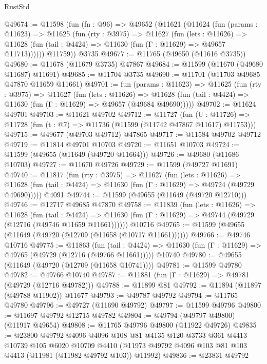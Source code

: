 \begin{lexlean}{RustStd}
\begin{coremodule}
@49674 := @11598
    (fun (fn : @96) =>
    @49652
      (@11621
        (@11624
          (fun (params : @11623) =>
          @11625
            (fun (rty : @3975) =>
            @11627
              (fun (lets : @11626) =>
              @11628 (fun (tail : @4424) => @11630 (fun (Γ : @11629) => @49657 @11713))))))
        @11759))
    @3735
@49677 := @11765 (@49650 (@11616 @3735))
@49680 := @11678 (@11679 @3735) @47867
@49684 := @11599 (@11670 (@49680 @11687) @11691)
@49685 := @11704 @3735
@49690 := @11701 (@11703 @49685 @47870 @11659 @11661)
@49701 := fun (params : @11623) =>
  @11625
    (fun (rty : @3975) =>
    @11627
      (fun (lets : @11626) =>
      @11628 (fun (tail : @4424) => @11630 (fun (Γ : @11629) => @49657 (@49684 @49690)))))
@49702 := @11624 @49701
@49703 := @11621 @49702
@49712 := @11727
    (fun (U : @11726) => @11728 (fun (t : @7) => @11736 (@11599 (@11742 @47867 @11617) @11753)))
@49715 := @49677 (@49703 @49712) @47865
@49717 := @11584 @49702 @49712
@49719 := @11814 @49701 @10703
@49720 := @11651 @10703
@49724 := @11599 (@49655 (@11649 (@49720 @11664)))
@49726 := @49680 (@11686 @10703)
@49727 := @11670 @49726
@49729 := @11599 (@49727 @11691)
@49740 := @11817
    (fun (rty : @3975) =>
    @11627
      (fun (lets : @11626) =>
      @11628 (fun (tail : @4424) => @11630 (fun (Γ : @11629) => @49724 (@49729 @49690)))))
    @4091
@49744 := @11599 (@49655 (@11649 (@49720 @12710)))
@49746 := @12717 @49685 @47870
@49758 := @11839
    (fun (lets : @11626) =>
    @11628
      (fun (tail : @4424) =>
      @11630 (fun (Γ : @11629) => @49744 (@49729 (@12716 (@49746 @11659 @11661))))))
    @10716
@49765 := @11599 (@49655 (@11649 (@49720 (@12709 (@11658 (@10717 @11661))))))
@49766 := @49746 @10716
@49775 := @11863
    (fun (tail : @4424) => @11630 (fun (Γ : @11629) => @49765 (@49729 (@12716 (@49766 @11661)))))
    @10740
@49780 := @49655 (@11649 (@49720 (@12709 (@11658 @10741))))
@49781 := @11599 @49780
@49782 := @49766 @10740
@49787 := @11881 (fun (Γ : @11629) => @49781 (@49729 (@12716 @49782)))
@49788 := @11899 @81
@49792 := @11894 (@11897 (@49788 @11902)) @11677
@49793 := @49787 @49792
@49794 := @11765 @49780
@49796 := @49727 (@11690 @49792)
@49797 := @11599 @49796
@49800 := @11697 @49792 @12715 @49782
@49804 := @49794 (@49797 @49800) (@11917 @49654)
@49808 := @11765 @49796 @49800 (@11922 @49726)
@49835 := @23800
    @49792
    @4096
    @4096
    @108
    @81
    @4135
    @120
    @3733
    @361
    @4413
    @10739
    @105
    @6020
    @10709
    @4410
    (@11973 @49792 @4096 @103 @81 @103 @4413 (@11981 (@11982 @49792 @103)) @11992)
@49836 := @23831 @49792

\end{coremodule}
\end{lexlean}
